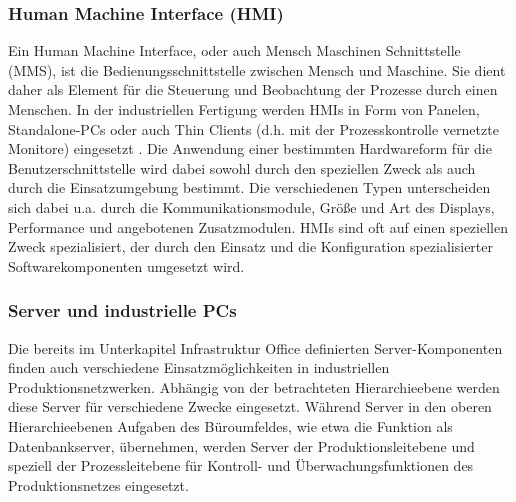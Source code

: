\subsubsection{Human Machine Interface (HMI)}
Ein Human Machine Interface, oder auch Mensch Maschinen Schnittstelle (MMS), ist die Bedienungsschnittstelle zwischen Mensch und Maschine. Sie dient daher als Element für die Steuerung und Beobachtung der Prozesse durch einen Menschen. In der industriellen Fertigung werden HMIs in Form von Panelen, Standalone-PCs oder auch Thin Clients (d.h. mit der Prozesskontrolle vernetzte Monitore) eingesetzt \citep{HMI1}. 
Die Anwendung einer bestimmten Hardwareform für die Benutzerschnittstelle wird dabei sowohl durch den speziellen Zweck als auch durch die Einsatzumgebung bestimmt. Die verschiedenen Typen unterscheiden sich dabei u.a. durch die Kommunikationsmodule, Größe und Art des Displays, Performance und angebotenen Zusatzmodulen\citep{HMI2}.
HMIs sind oft auf einen speziellen Zweck spezialisiert, der durch den Einsatz und die Konfiguration spezialisierter Softwarekomponenten umgesetzt wird\citep{HMI1}. 

\subsubsection{Server und industrielle PCs}
Die bereits im Unterkapitel \glqq Infrastruktur Office\grqq{} definierten Server-Komponenten finden auch verschiedene Einsatzmöglichkeiten in industriellen Produktionsnetzwerken. Abhängig von der betrachteten Hierarchieebene werden diese Server für verschiedene Zwecke eingesetzt. Während Server in den oberen Hierarchieebenen Aufgaben des Büroumfeldes, wie etwa die Funktion als Datenbankserver, übernehmen, werden Server der Produktionsleitebene und speziell der Prozessleitebene für Kontroll- und Überwachungsfunktionen des Produktionsnetzes eingesetzt. \\

